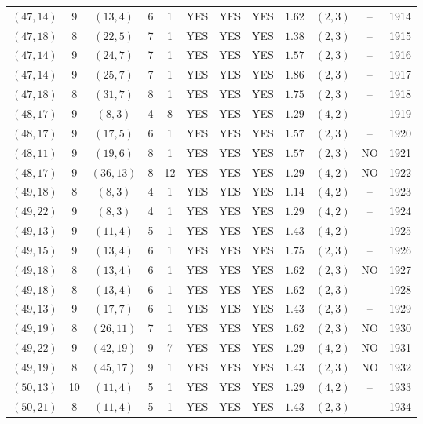 \begin{longtable}{|c|c|c|c|c|c|c|c|c|c|c|c|}
$(47,14)$ & 9 & $(13,4)$ & 6 & 1 & YES & YES & YES & $1.62$ & $(2,3)$ & -- & 1914\\
$(47,18)$ & 8 & $(22,5)$ & 7 & 1 & YES & YES & YES & $1.38$ & $(2,3)$ & -- & 1915\\
$(47,14)$ & 9 & $(24,7)$ & 7 & 1 & YES & YES & YES & $1.57$ & $(2,3)$ & -- & 1916\\
$(47,14)$ & 9 & $(25,7)$ & 7 & 1 & YES & YES & YES & $1.86$ & $(2,3)$ & -- & 1917\\
$(47,18)$ & 8 & $(31,7)$ & 8 & 1 & YES & YES & YES & $1.75$ & $(2,3)$ & -- & 1918\\
$(48,17)$ & 9 & $(8,3)$ & 4 & 8 & YES & YES & YES & $1.29$ & $(4,2)$ & -- & 1919\\
$(48,17)$ & 9 & $(17,5)$ & 6 & 1 & YES & YES & YES & $1.57$ & $(2,3)$ & -- & 1920\\
$(48,11)$ & 9 & $(19,6)$ & 8 & 1 & YES & YES & YES & $1.57$ & $(2,3)$ & NO & 1921\\
$(48,17)$ & 9 & $(36,13)$ & 8 & 12 & YES & YES & YES & $1.29$ & $(4,2)$ & NO & 1922\\
$(49,18)$ & 8 & $(8,3)$ & 4 & 1 & YES & YES & YES & $1.14$ & $(4,2)$ & -- & 1923\\
$(49,22)$ & 9 & $(8,3)$ & 4 & 1 & YES & YES & YES & $1.29$ & $(4,2)$ & -- & 1924\\
$(49,13)$ & 9 & $(11,4)$ & 5 & 1 & YES & YES & YES & $1.43$ & $(4,2)$ & -- & 1925\\
$(49,15)$ & 9 & $(13,4)$ & 6 & 1 & YES & YES & YES & $1.75$ & $(2,3)$ & -- & 1926\\
$(49,18)$ & 8 & $(13,4)$ & 6 & 1 & YES & YES & YES & $1.62$ & $(2,3)$ & NO & 1927\\
$(49,18)$ & 8 & $(13,4)$ & 6 & 1 & YES & YES & YES & $1.62$ & $(2,3)$ & -- & 1928\\
$(49,13)$ & 9 & $(17,7)$ & 6 & 1 & YES & YES & YES & $1.43$ & $(2,3)$ & -- & 1929\\
$(49,19)$ & 8 & $(26,11)$ & 7 & 1 & YES & YES & YES & $1.62$ & $(2,3)$ & NO & 1930\\
$(49,22)$ & 9 & $(42,19)$ & 9 & 7 & YES & YES & YES & $1.29$ & $(4,2)$ & NO & 1931\\
$(49,19)$ & 8 & $(45,17)$ & 9 & 1 & YES & YES & YES & $1.43$ & $(2,3)$ & NO & 1932\\
$(50,13)$ & 10 & $(11,4)$ & 5 & 1 & YES & YES & YES & $1.29$ & $(4,2)$ & -- & 1933\\
$(50,21)$ & 8 & $(11,4)$ & 5 & 1 & YES & YES & YES & $1.43$ & $(2,3)$ & -- & 1934\\

\end{longtable}
